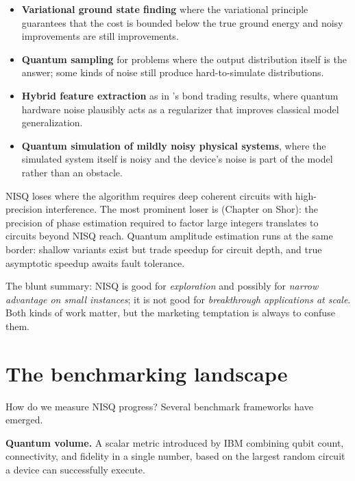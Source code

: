 \begin{itemize}
  \item \textbf{Variational ground state finding} where the variational principle guarantees that the cost is bounded below the true ground energy and noisy improvements are still improvements.
  \item \textbf{Quantum sampling} for problems where the output distribution itself is the answer; some kinds of noise still produce hard-to-simulate distributions.
  \item \textbf{Hybrid feature extraction} as in \citet{ciceri_enhanced_2025}'s bond trading results, where quantum hardware noise plausibly acts as a regularizer that improves classical model generalization.
  \item \textbf{Quantum simulation of mildly noisy physical systems}, where the simulated system itself is noisy and the device's noise is part of the model rather than an obstacle.
\end{itemize}

NISQ loses where the algorithm requires deep coherent circuits with high-precision interference. The most prominent loser is  (Chapter on Shor): the precision of phase estimation required to factor large integers translates to circuits beyond NISQ reach. Quantum amplitude estimation runs at the same border: shallow variants exist but trade speedup for circuit depth, and true asymptotic speedup awaits fault tolerance.

\begin{remark}
The blunt summary: NISQ is good for \emph{exploration} and possibly for \emph{narrow advantage on small instances}; it is not good for \emph{breakthrough applications at scale}. Both kinds of work matter, but the marketing temptation is always to confuse them.
\end{remark}

\section{The benchmarking landscape}

How do we measure NISQ progress? Several benchmark frameworks have emerged.

\textbf{Quantum volume.} A scalar metric introduced by IBM combining qubit count, connectivity, and fidelity in a single number, based on the largest random circuit a device can successfully execute.

